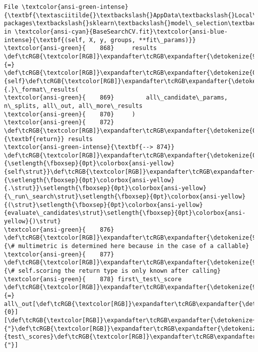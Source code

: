 \documentclass[11pt]{article}
\begin{document}
\begin{Verbatim}[commandchars=\\\{\}, frame=single, framerule=2mm, rulecolor=\color{outerrorbackground}]
File \textcolor{ansi-green-intense}{\textbf{\textasciitilde{}\textbackslash{}AppData\textbackslash{}Local\textbackslash{}anaconda3\textbackslash{}lib\textbackslash{}site-packages\textbackslash{}sklearn\textbackslash{}model\_selection\textbackslash{}\_search.py:874}}, in \textcolor{ansi-cyan}{BaseSearchCV.fit}\textcolor{ansi-blue-intense}{\textbf{(self, X, y, groups, **fit\_params)}}
\textcolor{ansi-green}{    868}     results \def\tcRGB{\textcolor[RGB]}\expandafter\tcRGB\expandafter{\detokenize{98,98,98}}{=} \def\tcRGB{\textcolor[RGB]}\expandafter\tcRGB\expandafter{\detokenize{0,135,0}}{self}\def\tcRGB{\textcolor[RGB]}\expandafter\tcRGB\expandafter{\detokenize{98,98,98}}{.}\_format\_results(
\textcolor{ansi-green}{    869}         all\_candidate\_params, n\_splits, all\_out, all\_more\_results
\textcolor{ansi-green}{    870}     )
\textcolor{ansi-green}{    872}     \def\tcRGB{\textcolor[RGB]}\expandafter\tcRGB\expandafter{\detokenize{0,135,0}}{\textbf{return}} results
\textcolor{ansi-green-intense}{\textbf{--> 874}} \def\tcRGB{\textcolor[RGB]}\expandafter\tcRGB\expandafter{\detokenize{0,135,0}}{\setlength{\fboxsep}{0pt}\colorbox{ansi-yellow}{self\strut}}\def\tcRGB{\textcolor[RGB]}\expandafter\tcRGB\expandafter{\detokenize{98,98,98}}{\setlength{\fboxsep}{0pt}\colorbox{ansi-yellow}{.\strut}}\setlength{\fboxsep}{0pt}\colorbox{ansi-yellow}{\_run\_search\strut}\setlength{\fboxsep}{0pt}\colorbox{ansi-yellow}{(\strut}\setlength{\fboxsep}{0pt}\colorbox{ansi-yellow}{evaluate\_candidates\strut}\setlength{\fboxsep}{0pt}\colorbox{ansi-yellow}{)\strut}
\textcolor{ansi-green}{    876} \def\tcRGB{\textcolor[RGB]}\expandafter\tcRGB\expandafter{\detokenize{95,135,135}}{\# multimetric is determined here because in the case of a callable}
\textcolor{ansi-green}{    877} \def\tcRGB{\textcolor[RGB]}\expandafter\tcRGB\expandafter{\detokenize{95,135,135}}{\# self.scoring the return type is only known after calling}
\textcolor{ansi-green}{    878} first\_test\_score \def\tcRGB{\textcolor[RGB]}\expandafter\tcRGB\expandafter{\detokenize{98,98,98}}{=} all\_out[\def\tcRGB{\textcolor[RGB]}\expandafter\tcRGB\expandafter{\detokenize{98,98,98}}{0}][\def\tcRGB{\textcolor[RGB]}\expandafter\tcRGB\expandafter{\detokenize{175,0,0}}{"}\def\tcRGB{\textcolor[RGB]}\expandafter\tcRGB\expandafter{\detokenize{175,0,0}}{test\_scores}\def\tcRGB{\textcolor[RGB]}\expandafter\tcRGB\expandafter{\detokenize{175,0,0}}{"}]


\end{Verbatim}
\end{document}
